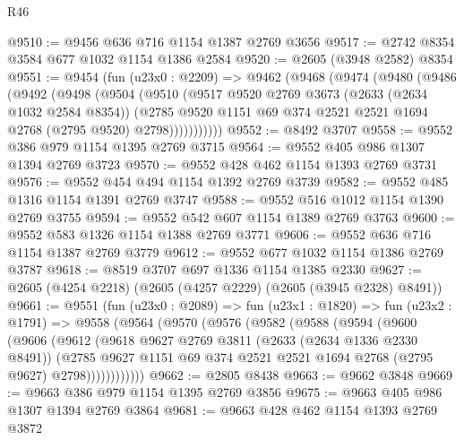 \begin{lexlean}{R46}
\begin{coremodule}
@9510 := @9456 @636 @716 @1154 @1387 @2769 @3656
@9517 := @2742 @8354 @3584 @677 @1032 @1154 @1386 @2584
@9520 := @2605 (@3948 @2582) @8354
@9551 := @9454
    (fun (u23x0 : @2209) =>
    @9462
      (@9468
        (@9474
          (@9480
            (@9486
              (@9492
                (@9498
                  (@9504
                    (@9510
                      (@9517
                        @9520
                        @2769
                        @3673
                        (@2633 (@2634 @1032 @2584 @8354))
                        (@2785
                          @9520
                          @1151
                          @69
                          @374
                          @2521
                          @2521
                          @1694
                          @2768
                          (@2795 @9520)
                          @2798)))))))))))
@9552 := @8492 @3707
@9558 := @9552 @386 @979 @1154 @1395 @2769 @3715
@9564 := @9552 @405 @986 @1307 @1394 @2769 @3723
@9570 := @9552 @428 @462 @1154 @1393 @2769 @3731
@9576 := @9552 @454 @494 @1154 @1392 @2769 @3739
@9582 := @9552 @485 @1316 @1154 @1391 @2769 @3747
@9588 := @9552 @516 @1012 @1154 @1390 @2769 @3755
@9594 := @9552 @542 @607 @1154 @1389 @2769 @3763
@9600 := @9552 @583 @1326 @1154 @1388 @2769 @3771
@9606 := @9552 @636 @716 @1154 @1387 @2769 @3779
@9612 := @9552 @677 @1032 @1154 @1386 @2769 @3787
@9618 := @8519 @3707 @697 @1336 @1154 @1385 @2330
@9627 := @2605 (@4254 @2218) (@2605 (@4257 @2229) (@2605 (@3945 @2328) @8491))
@9661 := @9551
    (fun (u23x0 : @2089) =>
    fun (u23x1 : @1820) =>
    fun (u23x2 : @1791) =>
    @9558
      (@9564
        (@9570
          (@9576
            (@9582
              (@9588
                (@9594
                  (@9600
                    (@9606
                      (@9612
                        (@9618
                          @9627
                          @2769
                          @3811
                          (@2633 (@2634 @1336 @2330 @8491))
                          (@2785
                            @9627
                            @1151
                            @69
                            @374
                            @2521
                            @2521
                            @1694
                            @2768
                            (@2795 @9627)
                            @2798))))))))))))
@9662 := @2805 @8438
@9663 := @9662 @3848
@9669 := @9663 @386 @979 @1154 @1395 @2769 @3856
@9675 := @9663 @405 @986 @1307 @1394 @2769 @3864
@9681 := @9663 @428 @462 @1154 @1393 @2769 @3872

\end{coremodule}
\end{lexlean}

